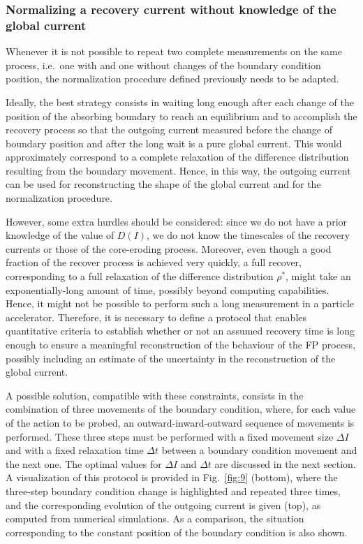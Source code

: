
\subsubsection{Normalizing a recovery current without knowledge of the global current}


Whenever it is not possible to repeat two complete measurements on the same process, i.e.\ one with and one without changes of the boundary condition position, the normalization procedure defined previously needs to be adapted.

Ideally, the best strategy consists in waiting long enough after each change of the position of the absorbing boundary to reach an equilibrium and to accomplish the recovery process so that the outgoing current measured before the change of boundary position and after the long wait is a pure global current. This would approximately correspond to a complete relaxation of the difference distribution resulting from the boundary movement. Hence, in this way, the outgoing current can be used for reconstructing the shape of the global current and for the normalization procedure.

However, some extra hurdles should be considered: since we do not have a prior knowledge of the value of $D(I)$, we do not know the timescales of the recovery currents or those of the core-eroding process. Moreover, even though a good fraction of the recover process is achieved very quickly, a full recover, corresponding to a full relaxation of the difference distribution $\rho^\ast$, might take an exponentially-long amount of time, possibly beyond computing capabilities. Hence, it might not be possible to perform such a long measurement in a particle accelerator. Therefore, it is necessary to define a protocol that enables quantitative criteria to establish whether or not an assumed recovery time is long enough to ensure a meaningful reconstruction of the behaviour of the FP process, possibly including an estimate of the uncertainty in the reconstruction of the global current.

A possible solution, compatible with these constraints, consists in the combination of three movements of the boundary condition, where, for each value of the action to be probed, an outward-inward-outward sequence of movements is performed. These three steps must be performed with a fixed movement size $\Delta I$ and with a fixed relaxation time $\Delta t$ between a boundary condition movement and the next one. The optimal values for $\Delta I$ and $\Delta t$ are discussed in the next section. A visualization of this protocol is provided in Fig.~\ref{fig:9} (bottom), where the three-step boundary condition change is highlighted and repeated three times, and the corresponding evolution of the outgoing current is given (top), as computed from numerical simulations. As a comparison, the situation corresponding to the constant position of the boundary condition is also shown.

